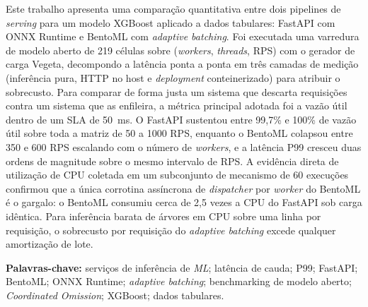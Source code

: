 \begin{abstract}
This work presents a quantitative comparison of two serving pipelines for an
XGBoost model on tabular data: FastAPI with ONNX Runtime, and BentoML with
\textit{adaptive batching}. A 219-cell open-loop benchmark sweep over
(workers, threads, RPS) was executed with the Vegeta load generator, and the
end-to-end latency was decomposed into three measurement layers (pure
inference, host HTTP, containerised deployment) to attribute overhead. To
compare a load-shedding system against a queueing system fairly, the headline
metric is goodput within a 50~ms SLA. FastAPI sustained between 99.7\% and
100\% of goodput across the matrix from 50 to 1000 RPS, while BentoML
collapsed between 350 and 600 RPS scaling with worker count, with the P99
latency growing by two orders of magnitude over the same RPS range. Direct
CPU-utilisation evidence collected on a 60-run mechanism subset confirmed
that the single asynchronous dispatcher coroutine per BentoML worker is the
bottleneck: BentoML consumed approximately 2.5 times the CPU of FastAPI under
identical load. For cheap single-row tree-ensemble inference on CPU,
adaptive batching's per-request plumbing exceeds any batching amortisation.
\end{abstract}

\begin{resumo}
Este trabalho apresenta uma comparação quantitativa entre dois pipelines de
\textit{serving} para um modelo XGBoost aplicado a dados tabulares: FastAPI
com ONNX Runtime e BentoML com \textit{adaptive batching}. Foi executada uma
varredura de modelo aberto de 219 células sobre (\textit{workers},
\textit{threads}, RPS) com o gerador de carga Vegeta, decompondo a latência
ponta a ponta em três camadas de medição (inferência pura, HTTP no host e
\textit{deployment} conteinerizado) para atribuir o sobrecusto. Para comparar
de forma justa um sistema que descarta requisições contra um sistema que as
enfileira, a métrica principal adotada foi a vazão útil dentro de um SLA de
50~ms. O FastAPI sustentou entre 99,7\% e 100\% de vazão útil sobre toda a
matriz de 50 a 1000 RPS, enquanto o BentoML colapsou entre 350 e 600 RPS
escalando com o número de \textit{workers}, e a latência P99 cresceu duas
ordens de magnitude sobre o mesmo intervalo de RPS. A evidência direta de
utilização de CPU coletada em um subconjunto de mecanismo de 60 execuções
confirmou que a única corrotina assíncrona de \textit{dispatcher} por
\textit{worker} do BentoML é o gargalo: o BentoML consumiu cerca de 2,5 vezes
a CPU do FastAPI sob carga idêntica. Para inferência barata de árvores em
CPU sobre uma linha por requisição, o sobrecusto por requisição do
\textit{adaptive batching} excede qualquer amortização de lote.

\textbf{Palavras-chave:} serviços de inferência de \textit{ML}; latência de
cauda; P99; FastAPI; BentoML; ONNX Runtime; \textit{adaptive batching};
benchmarking de modelo aberto; \textit{Coordinated Omission}; XGBoost; dados
tabulares.
\end{resumo}

